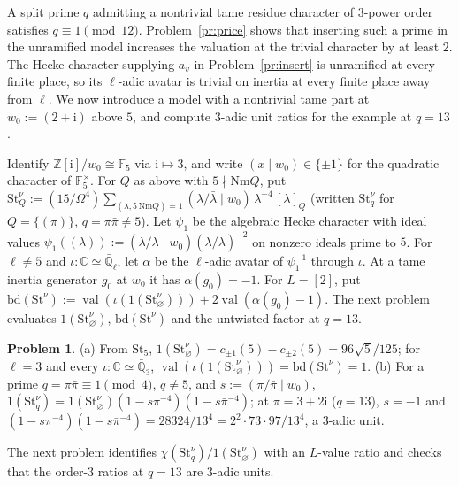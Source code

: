 \documentclass[reqno]{amsart}
\theoremstyle{definition}
\newtheorem{problem}{Problem}[section]
\theoremstyle{plain}
\theoremstyle{remark}
\newcommand{\Z}{\mathbb{Z}}
\newcommand{\Q}{\mathbb{Q}}
\newcommand{\C}{\mathbb{C}}
\newcommand{\F}{\mathbb{F}}
\newcommand{\Ql}{\bar{\mathbb{Q}}_\ell}
\newcommand{\ii}{\mathrm{i}}
\newcommand{\St}{\mathrm{St}}
\newcommand{\bd}{\mathrm{bd}}
\newcommand{\Nm}{\mathrm{Nm}}
\newcommand{\val}{\operatorname{val}}
\begin{document}
A split prime \(q\) admitting a nontrivial tame residue character of \(3\)-power order satisfies \(q \equiv 1 \pmod{12}\).  Problem~\ref{pr:price} shows that inserting such a prime in the unramified model increases the valuation at the trivial character by at least \(2\).  The Hecke character supplying \(a_v\) in Problem~\ref{pr:insert} is unramified at every finite place, so its \(\ell\)-adic avatar is trivial on inertia at every finite place away from \(\ell\).  We now introduce a model with a nontrivial tame part at \(w_0 := (2 + \ii)\) above \(5\), and compute \(3\)-adic unit ratios for the example at \(q = 13\).

Identify \(\Z[\ii]/w_0 \cong \F_5\) via \(\ii \mapsto 3\), and write \((x \mid w_0) \in \{\pm 1\}\) for the quadratic character of \(\F_5^\times\).  For \(Q\) as above with \(5 \nmid \Nm Q\), put \(\St^\nu_Q := (15/\Omega^4) \sum_{(\lambda, 5\,\Nm Q) = 1} (\lambda/\bar\lambda \mid w_0)\,\lambda^{-4}\,[\lambda]_Q\) (written \(\St^\nu_q\) for \(Q = \{(\pi)\}\), \(q = \pi\bar\pi \ne 5\)).  Let \(\psi_1\) be the algebraic Hecke character with ideal values \(\psi_1((\lambda)) := (\lambda/\bar\lambda \mid w_0)(\lambda/\bar\lambda)^{-2}\) on nonzero ideals prime to \(5\).  For \(\ell \ne 5\) and \(\iota \colon \C \simeq \Ql\), let \(\alpha\) be the \(\ell\)-adic avatar of \(\psi_1^{-1}\) through \(\iota\).  At a tame inertia generator \(g_0\) at \(w_0\) it has \(\alpha(g_0) = -1\).  For \(L = [2]\), put \(\bd(\St^\nu) := \val(\iota(1(\St^\nu_\varnothing))) + 2\val(\alpha(g_0) - 1)\).  The next problem evaluates \(1(\St^\nu_\varnothing)\), \(\bd(\St^\nu)\) and the untwisted factor at \(q = 13\).

\begin{problem}\label{pr:ram-empty}
\textup{(a)} From \(\St_5\), \(1(\St^\nu_\varnothing) = c_{\pm 1}(5) - c_{\pm 2}(5) = 96\sqrt{5}/125\); for \(\ell = 3\) and every \(\iota \colon \C \simeq \bar{\Q}_3\), \(\val(\iota(1(\St^\nu_\varnothing))) = \bd(\St^\nu) = 1\).
\textup{(b)} For a prime \(q = \pi\bar\pi \equiv 1 \pmod 4\), \(q \ne 5\), and \(s := (\pi/\bar\pi \mid w_0)\), \(1(\St^\nu_q) = 1(\St^\nu_\varnothing)(1 - s\pi^{-4})(1 - s\bar\pi^{-4})\); at \(\pi = 3 + 2\ii\) (\(q = 13\)), \(s = -1\) and \((1 - s\pi^{-4})(1 - s\bar\pi^{-4}) = 28324/13^4 = 2^2\cdot 73\cdot 97/13^4\), a \(3\)-adic unit.
\end{problem}

The next problem identifies \(\chi(\St^\nu_q)/1(\St^\nu_\varnothing)\) with an \(L\)-value ratio and checks that the order-\(3\) ratios at \(q = 13\) are \(3\)-adic units.
\end{document}

